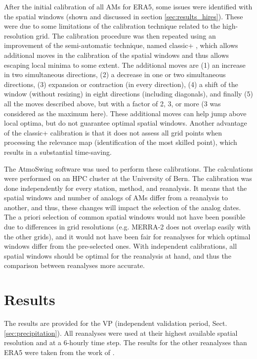 \documentclass[alpha-refs]{wiley-article}
\begin{document}
After the initial calibration of all AMs for ERA5, some issues were identified with the spatial windows (shown and discussed in section \ref{sec:results_hires}). These were due to some limitations of the calibration technique related to the high-resolution grid. The calibration procedure was then repeated using an improvement of the semi-automatic technique, named classic+ \citep{Horton2019}, which allows additional moves in the calibration of the spatial windows and thus allows escaping local minima to some extent. The additional moves are (1) an increase in two simultaneous directions, (2) a decrease in one or two simultaneous directions, (3) expansion or contraction (in every direction), (4) a shift of the window (without resizing) in eight directions (including diagonals), and finally (5) all the moves described above, but with a factor of 2, 3, or more (3 was considered as the maximum here). These additional moves can help jump above local optima, but do not guarantee optimal spatial windows. Another advantage of the classic+ calibration is that it does not assess all grid points when processing the relevance map (identification of the most skilled point), which results in a substantial time-saving.

The AtmoSwing software \citep{Horton2019} was used to perform these calibrations. The calculations were performed on an HPC cluster at the University of Bern. The calibration was done independently for every station, method, and reanalysis. It means that the spatial windows and number of analogs of AMs differ from a reanalysis to another, and thus, these changes will impact the selection of the analog dates. The a priori selection of common spatial windows would not have been possible due to differences in grid resolutions (e.g. MERRA-2 does not overlap easily with the other grids), and it would not have been fair for reanalyses for which optimal windows differ from the pre-selected ones. With independent calibrations, all spatial windows should be optimal for the reanalysis at hand, and thus the comparison between reanalyses more accurate.


\section{Results}
\label{sec:results}

The results are provided for the VP (independent validation period, Sect. \ref{sec:precipitation}). All reanalyses were used at their highest available spatial resolution and at a 6-hourly time step. The results for the other reanalyses than ERA5 were taken from the work of \citet{Horton2018b}.
\end{document}

